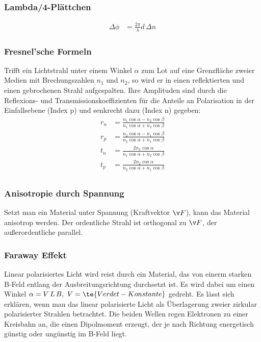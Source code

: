 \documentclass[twocolumn, unnumberedsubsub]{summery}
\begin{document}
\subsubsection{Lambda/4-Plättchen}
\begin{align*}
\Delta \phi &=\frac{2\pi}{\lambda} d \,\Delta n
\end{align*}

\subsubsection{Fresnel'sche Formeln}
Trifft ein Lichtstrahl unter einem Winkel \(\alpha\) zum Lot auf eine Grenzfläche 
zweier Medien mit Brechungszahlen $n_1$ und $n_2$, so wird er in
einen reflektierten und einen gebrochenen Strahl aufgespalten. Ihre
Amplituden sind durch die Reflexions- und Transmissionskoeffizienten 
für die Anteile an Polarisation in der Einfallsebene (Index p) und
senkrecht dazu (Index n) gegeben:
\begin{align*}
    r_n &= \frac{n_1\cos\alpha - n_2\cos\beta}{n_1\cos\alpha + n_2\cos\beta}\\
    r_p &= \frac{n_2\cos\alpha - n_1\cos\beta}{n_2\cos\alpha + n_1\cos\beta}\\
    t_n &= \frac{2 n_1 \cos\alpha}{n_1\cos\alpha + n_2\cos\beta}\\
    t_p &= \frac{2 n_2 \cos\alpha}{n_2\cos\alpha + n_1\cos\beta}\\
\end{align*}

\subsubsection{Anisotropie durch Spannung}
Setzt man ein Material unter Spannung (Kraftvektor \(\v F\)), kann das Material 
anisotrop werden. Der ordentliche Strahl ist orthogonal zu \(\v F\), der
außerordentliche parallel.

\subsubsection{Faraway Effekt}
Linear polarisiertes Licht wird reist durch ein Material, das von einerm starken 
B-Feld entlang der Ausbreitungsrichtung durchsetzt ist. Es wird dabei 
um einen Winkel \(\alpha = V\, L \, B, \ V=\te{Verdet-Konstante}\) gedreht. Es lässt sich erklären, wenn man das linear polarisierte Licht als 
Überlagerung zweier zirkular polarisierter Strahlen betrachtet. 
Die beiden Wellen regen Elektronen zu einer Kreisbahn an, die einen Dipolmoment erzeugt,
der je nach Richtung energetisch günstig oder ungünstig im B-Feld liegt.
\end{document}
